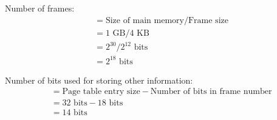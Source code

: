 \documentclass[12pt]{article}
\begin{document}
\begin{enumerate}
  Number of frames:
  \begin{align*}
    &= \text{Size of main memory} / \text{Frame size} \\
    &= 1 \text{ GB} / 4 \text{ KB} \\
    &= 2^{30} / 2^{12} \text{ bits} \\
    &= 2^{18} \text{ bits}
  \end{align*}

  Number of bits used for storing other information:
  \begin{align*}
    &= \text{Page table entry size} - \text{Number of bits in frame number} \\
    &= 32 \text{ bits} - 18 \text{ bits} \\
    &= 14 \text{ bits}
  \end{align*}

  \end{enumerate}
\end{document}
